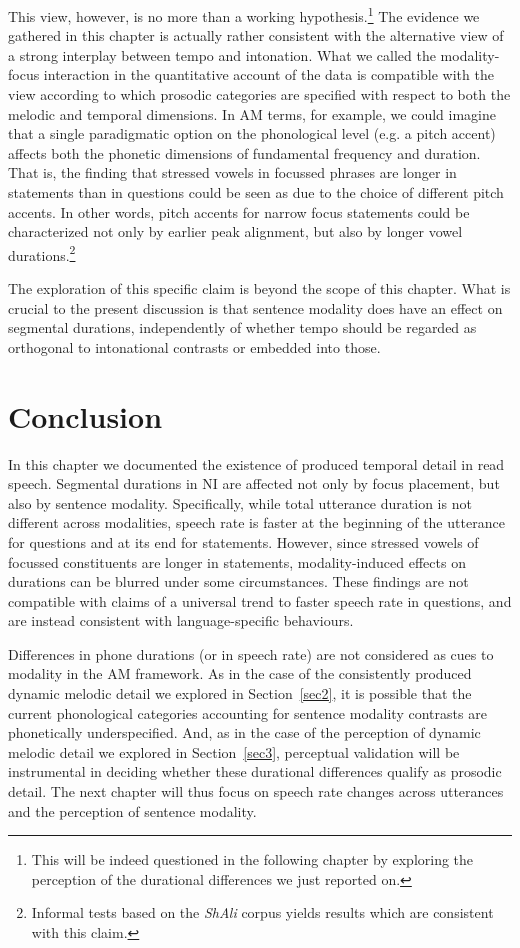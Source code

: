 This view, however, is no more than a working hypothesis.\footnote{This will be indeed questioned in the following chapter by exploring the perception of the durational differences we just reported on.} The evidence we gathered in this chapter is actually rather consistent with the alternative view of a strong interplay between tempo and intonation. What we called the modality-focus interaction in the quantitative account of the data is compatible with the view according to which prosodic categories are specified with respect to both the melodic and temporal dimensions. In AM terms, for example, we could imagine that a single paradigmatic option on the phonological level (e.g. a pitch accent) affects both the phonetic dimensions of fundamental frequency and duration. That is, the finding that stressed vowels in focussed phrases are longer in statements than in questions could be seen as due to the choice of different pitch accents. In other words, pitch accents for narrow focus statements could be characterized not only by earlier peak alignment, but also by longer vowel durations.\footnote{Informal tests based on the \textit{ShAli} corpus \citep{niebuhr2011shapers} yields results which are consistent with this claim.} 

The exploration of this specific claim is beyond the scope of this chapter. What is crucial to the present discussion is that sentence modality does have an effect on segmental durations, independently of whether tempo should be regarded as orthogonal to intonational contrasts or embedded into those. 

\section{Conclusion}\label{sec46}
In this chapter we documented the existence of produced temporal detail in read speech. Segmental durations in NI are affected not only by focus placement, but also by sentence modality. Specifically, while total utterance duration is not different across modalities, speech rate is faster at the beginning of the utterance for questions and at its end for statements. However, since stressed vowels of focussed constituents are longer in statements, modality-induced effects on durations can be blurred under some circumstances. These findings are not compatible with claims of a universal trend to faster speech rate in questions, and are instead consistent with language-specific behaviours. 

Differences in phone durations (or in speech rate) are not considered as cues to modality in the AM framework. As in the case of the consistently produced dynamic melodic detail we explored in Section~\ref{sec2}, it is possible that the current phonological categories accounting for sentence modality contrasts are phonetically underspecified. And, as in the case of the perception of dynamic melodic detail we explored in Section~\ref{sec3}, perceptual validation will be instrumental in deciding whether these durational differences qualify as prosodic detail. The next chapter will thus focus on speech rate changes across utterances and the perception of sentence modality.

